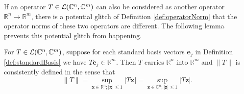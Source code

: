 \begin{rem}
  If an operator $T\in{\cal L}(\mathbb{C}^n,\mathbb{C}^m)$
  can also be considered as another operator
  $\mathbb{R}^n \rightarrow \mathbb{R}^m$, 
  there is a potential glitch of Definition \ref{def:operatorNorm}
  that the operator norms
  of these two operators are different.
  The following lemma prevents this potential glitch
  from happening.
\end{rem}

\begin{lem}
  \label{lem:consistencyNestedRealInsideComplex}
  For $T\in{\cal L}(\mathbb{C}^n,\mathbb{C}^m)$, 
  suppose for each standard basis vectors $\mathbf{e}_j$
  in Definition \ref{def:standardBasis}
  we have $T \mathbf{e}_j \in \mathbb{R}^m$.
  Then $T$ carries $\mathbb{R}^n$ into $\mathbb{R}^m$
  and $\|T\|$ is consistently defined in the sense that
  \begin{equation}
    \label{eq:consistencyNestedRealInsideComplex}
    \|T\|
    = \sup_{\mathbf{x}\in \mathbb{R}^n; |\mathbf{x}|\le 1} |T \mathbf{x}|
    = \sup_{\mathbf{z}\in \mathbb{C}^n; |\mathbf{z}|\le 1} |T \mathbf{z}|.
  \end{equation}
\end{lem}
